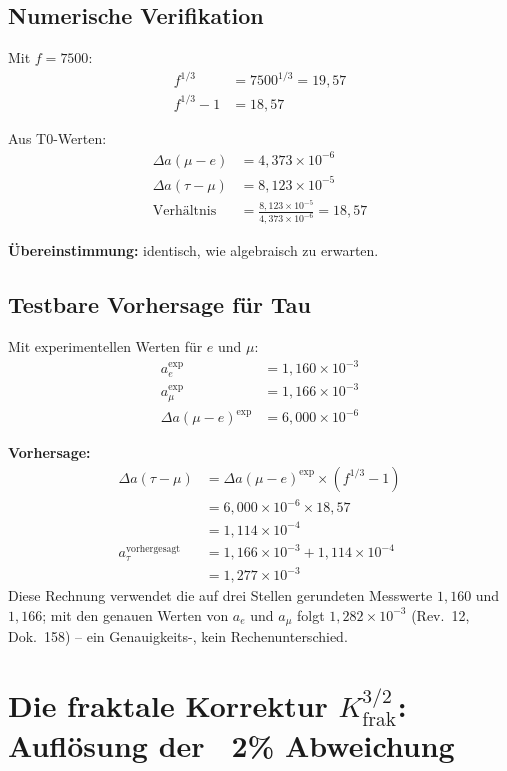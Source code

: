 	\subsection{Numerische Verifikation}
	
	Mit $f = 7500$:
	\begin{align}
		f^{1/3} &= 7500^{1/3} = 19{,}57 \\
		f^{1/3} - 1 &= 18{,}57
	\end{align}
	
	Aus T0-Werten:
	\begin{align}
		\Delta a(\mu - e) &= 4{,}373 \times 10^{-6} \\
		\Delta a(\tau - \mu) &= 8{,}123 \times 10^{-5} \\
		\text{Verhältnis} &= \frac{8{,}123 \times 10^{-5}}{4{,}373 \times 10^{-6}} = 18{,}57
	\end{align}
	
	\textbf{Übereinstimmung:} identisch, wie algebraisch zu erwarten.
	
	\subsection{Testbare Vorhersage für Tau}
	
	Mit experimentellen Werten für $e$ und $\mu$:
	\begin{align}
		a_e^{\text{exp}} &= 1{,}160 \times 10^{-3} \\
		a_\mu^{\text{exp}} &= 1{,}166 \times 10^{-3} \\
		\Delta a(\mu - e)^{\text{exp}} &= 6{,}000 \times 10^{-6}
	\end{align}
	
	\textbf{Vorhersage:}
	\begin{align}
		\Delta a(\tau - \mu) &= \Delta a(\mu - e)^{\text{exp}} \times (f^{1/3} - 1) \\
		&= 6{,}000 \times 10^{-6} \times 18{,}57 \\
		&= 1{,}114 \times 10^{-4} \\
		a_\tau^{\text{vorhergesagt}} &= 1{,}166 \times 10^{-3} + 1{,}114 \times 10^{-4} \\
		&= 1{,}277 \times 10^{-3}
	\end{align}
	Diese Rechnung verwendet die auf drei Stellen gerundeten Messwerte $1{,}160$ und $1{,}166$; mit den genauen Werten von $a_e$ und $a_\mu$ folgt $1{,}282 \times 10^{-3}$ (Rev.~12, Dok.~158) -- ein Genauigkeits-, kein Rechenunterschied.
	
	\section{Die fraktale Korrektur $K_\text{frak}^{3/2}$: Auflösung der ~2\% Abweichung}
	
